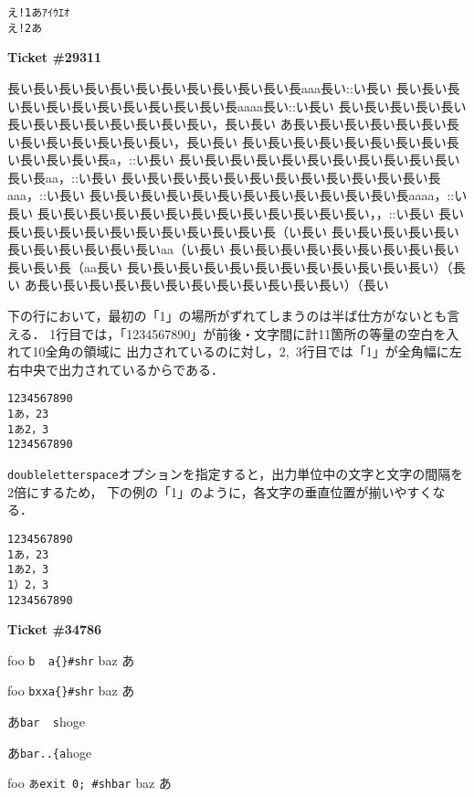 \documentclass{jarticle}
\begin{document}
\begin{lstlisting}
え!1あｱｲｳｴｵ
え!2あ
\end{lstlisting}
\newpage
\textbf{Ticket \#29311}

\begin{env}{\relax}
長い長い長い長い長い長い長い長い長い長い長い長aaa長い::い長い
長い長い長い長い長い長い長い長い長い長い長い長aaaa長い::い長い
長い長い長い長い長い長い長い長い長い長い長い長い長い，長い長い
あ長い長い長い長い長い長い長い長い長い長い長い長い長い，長い長い
長い長い長い長い長い長い長い長い長い長い長い長い長a，::い長い
長い長い長い長い長い長い長い長い長い長い長い長い長aa，::い長い
長い長い長い長い長い長い長い長い長い長い長い長い長aaa，::い長い
長い長い長い長い長い長い長い長い長い長い長い長い長aaaa，::い長い
長い長い長い長い長い長い長い長い長い長い長い長い長い，，::い長い
長い長い長い長い長い長い長い長い長い長い長い長（い長い
長い長い長い長い長い長い長い長い長い長い長いaa（い長い
長い長い長い長い長い長い長い長い長い長い長い長（aa長い
長い長い長い長い長い長い長い長い長い長い長い長い）（長い
あ長い長い長い長い長い長い長い長い長い長い長い長い）（長い
\end{env}

下の行において，最初の「1」の場所がずれてしまうのは半ば仕方がないとも言える．
1行目では，「1234567890」が前後・文字間に計11箇所の等量の空白を入れて10全角の領域に
出力されているのに対し，2,~3行目では「1」が全角幅に左右中央で出力されているからである．
\begin{lstlisting}[escapechar=\%, basewidth=1em, basicstyle=\tt]
1234567890
1あ，23
1あ2，3
1234567890
\end{lstlisting}

\texttt{doubleletterspace}オプションを指定すると，出力単位中の文字と文字の間隔を2倍にするため，
下の例の「1」のように，各文字の垂直位置が揃いやすくなる．
\begin{lstlisting}[escapechar=\%,doubleletterspace, basewidth=1em, basicstyle=\tt]
1234567890
1あ，23
1あ2，3
1）2，3
1234567890
\end{lstlisting}


\newpage
\textbf{Ticket \#34786}

foo \lstinline[basicstyle=\tt]!b  a{}#shr! baz あ

foo \lstinline[basicstyle=\tt]!bxxa{}#shr! baz あ

あ\lstinline[basicstyle=\tt]{bar  s}hoge

あ\lstinline[basicstyle=\tt]{bar..{a}hoge

foo \lstinline[basicstyle=\tt\gtfamily]!あexit 0; #shbar! baz あ
\end{document}
